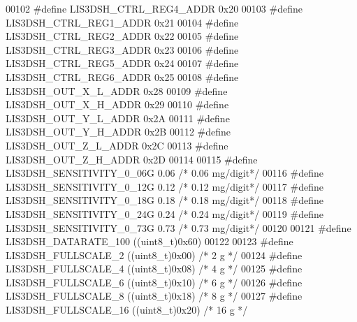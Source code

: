 \begin{DoxyCode}
00102 \textcolor{preprocessor}{#define LIS3DSH\_CTRL\_REG4\_ADDR              0x20}
00103 \textcolor{preprocessor}{#define LIS3DSH\_CTRL\_REG1\_ADDR              0x21}
00104 \textcolor{preprocessor}{#define LIS3DSH\_CTRL\_REG2\_ADDR              0x22}
00105 \textcolor{preprocessor}{#define LIS3DSH\_CTRL\_REG3\_ADDR              0x23}
00106 \textcolor{preprocessor}{#define LIS3DSH\_CTRL\_REG5\_ADDR              0x24}
00107 \textcolor{preprocessor}{#define LIS3DSH\_CTRL\_REG6\_ADDR              0x25}
00108 \textcolor{preprocessor}{#define LIS3DSH\_OUT\_X\_L\_ADDR                0x28}
00109 \textcolor{preprocessor}{#define LIS3DSH\_OUT\_X\_H\_ADDR                0x29}
00110 \textcolor{preprocessor}{#define LIS3DSH\_OUT\_Y\_L\_ADDR                0x2A}
00111 \textcolor{preprocessor}{#define LIS3DSH\_OUT\_Y\_H\_ADDR                0x2B}
00112 \textcolor{preprocessor}{#define LIS3DSH\_OUT\_Z\_L\_ADDR                0x2C}
00113 \textcolor{preprocessor}{#define LIS3DSH\_OUT\_Z\_H\_ADDR                0x2D}
00114 
00115 \textcolor{preprocessor}{#define LIS3DSH\_SENSITIVITY\_0\_06G            0.06  }\textcolor{comment}{/* 0.06 mg/digit*/}\textcolor{preprocessor}{}
00116 \textcolor{preprocessor}{#define LIS3DSH\_SENSITIVITY\_0\_12G            0.12  }\textcolor{comment}{/* 0.12 mg/digit*/}\textcolor{preprocessor}{}
00117 \textcolor{preprocessor}{#define LIS3DSH\_SENSITIVITY\_0\_18G            0.18  }\textcolor{comment}{/* 0.18 mg/digit*/}\textcolor{preprocessor}{}
00118 \textcolor{preprocessor}{#define LIS3DSH\_SENSITIVITY\_0\_24G            0.24  }\textcolor{comment}{/* 0.24 mg/digit*/}\textcolor{preprocessor}{}
00119 \textcolor{preprocessor}{#define LIS3DSH\_SENSITIVITY\_0\_73G            0.73  }\textcolor{comment}{/* 0.73 mg/digit*/}\textcolor{preprocessor}{}
00120 
00121 \textcolor{preprocessor}{#define LIS3DSH\_DATARATE\_100                ((uint8\_t)0x60)}
00122 
00123 \textcolor{preprocessor}{#define LIS3DSH\_FULLSCALE\_2                 ((uint8\_t)0x00)  }\textcolor{comment}{/* 2 g  */}\textcolor{preprocessor}{}
00124 \textcolor{preprocessor}{#define LIS3DSH\_FULLSCALE\_4                 ((uint8\_t)0x08)  }\textcolor{comment}{/* 4 g  */}\textcolor{preprocessor}{}
00125 \textcolor{preprocessor}{#define LIS3DSH\_FULLSCALE\_6                 ((uint8\_t)0x10)  }\textcolor{comment}{/* 6 g  */}\textcolor{preprocessor}{}
00126 \textcolor{preprocessor}{#define LIS3DSH\_FULLSCALE\_8                 ((uint8\_t)0x18)  }\textcolor{comment}{/* 8 g  */}\textcolor{preprocessor}{}
00127 \textcolor{preprocessor}{#define LIS3DSH\_FULLSCALE\_16                ((uint8\_t)0x20)  }\textcolor{comment}{/* 16 g */}\textcolor{preprocessor}{}

\end{DoxyCode}
